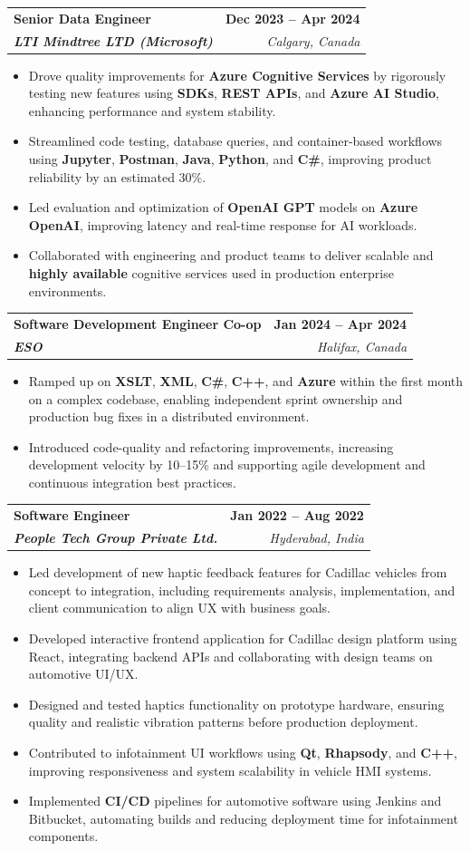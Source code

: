 \documentclass[letterpaper,11pt]{article}
\makeatletter
\newcommand{\resumeItem}[1]{
  \item\small{
    {#1 \vspace{-2pt}}
  }
}
\newcommand{\resumeSubheading}[4]{
  \vspace{-2pt}\item
    \begin{tabular*}{1.0\textwidth}[t]{l@{\extracolsep{\fill}}r}
      \textbf{#1} & \textbf{\small #2} \\
      \textit{\small#3} & \textit{\small #4} \\
    \end{tabular*}\vspace{-7pt}
}
\newcommand{\resumeItemListStart}{\begin{itemize}}
\newcommand{\resumeItemListEnd}{\end{itemize}\vspace{-5pt}}
\makeatother
\begin{document}
    \resumeSubheading
      {\textbf{Senior Data Engineer}}{\textbf{Dec 2023 -- Apr 2024}}
      {\textbf{LTI Mindtree LTD (Microsoft)}}{Calgary, Canada}
      \resumeItemListStart
        \resumeItem{Drove quality improvements for \textbf{Azure Cognitive Services} by rigorously testing new features using \textbf{SDKs}, \textbf{REST APIs}, and \textbf{Azure AI Studio}, enhancing performance and system stability.}
        \resumeItem{Streamlined code testing, database queries, and container-based workflows using \textbf{Jupyter}, \textbf{Postman}, \textbf{Java}, \textbf{Python}, and \textbf{C\#}, improving product reliability by an estimated 30\%.}
        \resumeItem{Led evaluation and optimization of \textbf{OpenAI GPT} models on \textbf{Azure OpenAI}, improving latency and real-time response for AI workloads.}
        \resumeItem{Collaborated with engineering and product teams to deliver scalable and \textbf{highly available} cognitive services used in production enterprise environments.}
      \resumeItemListEnd
    
    \resumeSubheading
      {\textbf{Software Development Engineer Co-op}}{\textbf{Jan 2024 -- Apr 2024}}
      {\textbf{ESO}}{Halifax, Canada}
      \resumeItemListStart
        \resumeItem{Ramped up on \textbf{XSLT}, \textbf{XML}, \textbf{C\#}, \textbf{C++}, and \textbf{Azure} within the first month on a complex codebase, enabling independent sprint ownership and production bug fixes in a distributed environment.}
        \resumeItem{Introduced code-quality and refactoring improvements, increasing development velocity by 10--15\% and supporting agile development and continuous integration best practices.}
      \resumeItemListEnd

    \resumeSubheading
      {\textbf{Software Engineer}}{\textbf{Jan 2022 -- Aug 2022}}
      {\textbf{People Tech Group Private Ltd.}}{Hyderabad, India}
      \resumeItemListStart
        \resumeItem{Led development of new haptic feedback features for Cadillac vehicles from concept to integration, including requirements analysis, implementation, and client communication to align UX with business goals.}
        \resumeItem{Developed interactive frontend application for Cadillac design platform using React, integrating backend APIs and collaborating with design teams on automotive UI/UX.}
        \resumeItem{Designed and tested haptics functionality on prototype hardware, ensuring quality and realistic vibration patterns before production deployment.}
        \resumeItem{Contributed to infotainment UI workflows using \textbf{Qt}, \textbf{Rhapsody}, and \textbf{C++}, improving responsiveness and system scalability in vehicle HMI systems.}
        \resumeItem{Implemented \textbf{CI/CD} pipelines for automotive software using Jenkins and Bitbucket, automating builds and reducing deployment time for infotainment components.}
      \resumeItemListEnd
\end{document}
